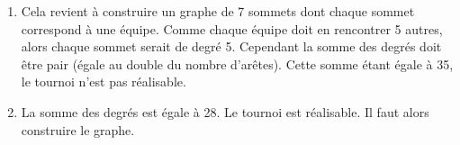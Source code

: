 \documentclass[a4paper,11pt]{article}
\begin{document}
\begin{Form}
\begin{exo}
\begin{enumerate}
\end{enumerate}
\end{exo}
\begin{exo}
\begin{enumerate}
\item Cela revient à construire un graphe de 7 sommets dont chaque sommet correspond à une équipe. Comme chaque équipe doit en rencontrer 5 autres, alors chaque sommet serait de degré 5. Cependant la somme des degrés doit être pair (égale au double du nombre d'arêtes). Cette somme étant égale à 35, le tournoi n'est pas réalisable.
\item La somme des degrés est égale à 28. Le tournoi est réalisable. Il faut alors construire le graphe.
\begin{center}
\end{center}
\end{enumerate}
\end{exo}
\end{Form}
\end{document}
